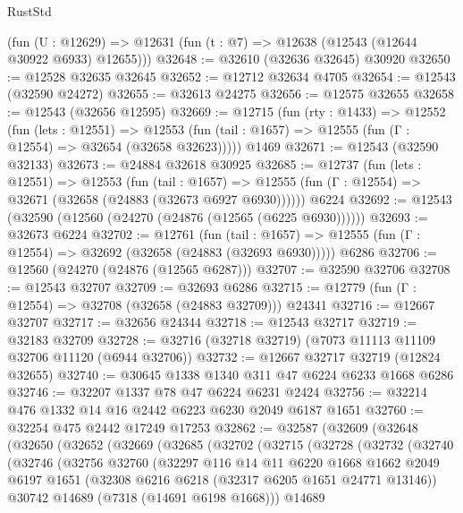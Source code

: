 \begin{lexlean}{RustStd}
\begin{coremodule}
    (fun (U : @12629) => @12631 (fun (t : @7) => @12638 (@12543 (@12644 @30922 @6933) @12655)))
@32648 := @32610 (@32636 @32645) @30920
@32650 := @12528 @32635 @32645
@32652 := @12712 @32634 @4705
@32654 := @12543 (@32590 @24272)
@32655 := @32613 @24275
@32656 := @12575 @32655
@32658 := @12543 (@32656 @12595)
@32669 := @12715
    (fun (rty : @1433) =>
    @12552
      (fun (lets : @12551) =>
      @12553 (fun (tail : @1657) => @12555 (fun (Γ : @12554) => @32654 (@32658 @32623)))))
    @1469
@32671 := @12543 (@32590 @32133)
@32673 := @24884 @32618 @30925
@32685 := @12737
    (fun (lets : @12551) =>
    @12553
      (fun (tail : @1657) =>
      @12555 (fun (Γ : @12554) => @32671 (@32658 (@24883 (@32673 @6927 @6930))))))
    @6224
@32692 := @12543 (@32590 (@12560 (@24270 (@24876 (@12565 (@6225 @6930))))))
@32693 := @32673 @6224
@32702 := @12761
    (fun (tail : @1657) => @12555 (fun (Γ : @12554) => @32692 (@32658 (@24883 (@32693 @6930)))))
    @6286
@32706 := @12560 (@24270 (@24876 (@12565 @6287)))
@32707 := @32590 @32706
@32708 := @12543 @32707
@32709 := @32693 @6286
@32715 := @12779 (fun (Γ : @12554) => @32708 (@32658 (@24883 @32709))) @24341
@32716 := @12667 @32707
@32717 := @32656 @24344
@32718 := @12543 @32717
@32719 := @32183 @32709
@32728 := @32716 (@32718 @32719) (@7073 @11113 @11109 @32706 @11120 (@6944 @32706))
@32732 := @12667 @32717 @32719 (@12824 @32655)
@32740 := @30645 @1338 @1340 @311 @47 @6224 @6233 @1668 @6286
@32746 := @32207 @1337 @78 @47 @6224 @6231 @2424
@32756 := @32214 @476 @1332 @14 @16 @2442 @6223 @6230 @2049 @6187 @1651
@32760 := @32254 @475 @2442 @17249 @17253
@32862 := @32587
    (@32609
      (@32648
        (@32650
          (@32652
            (@32669
              (@32685
                (@32702
                  (@32715
                    (@32728
                      (@32732
                        (@32740
                          (@32746
                            (@32756
                              @32760
                              (@32297
                                @116
                                @14
                                @11
                                @6220
                                @1668
                                @1662
                                @2049
                                @6197
                                @1651
                                (@32308 @6216 @6218 (@32317 @6205 @1651 @24771 @13146))
                                @30742
                                @14689
                                (@7318 (@14691 @6198 @1668)))
                              @14689

\end{coremodule}
\end{lexlean}
